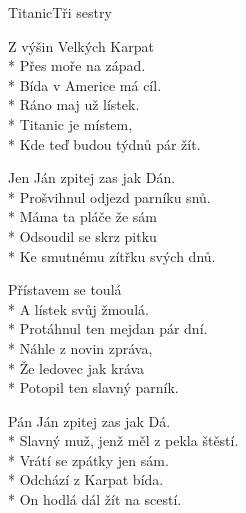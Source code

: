 \documentclass[10.5pt]{book}
\begin{document}
\begin{poem}{Titanic}{Tři sestry}

\settowidth{\versewidth}{Slavný muž, jenž měl z pekla štěstí}

Z výšin Velkých Karpat\\*
Přes moře na západ.\\*
Bída v Americe má cíl.\\*
Ráno maj už lístek.\\*
Titanic je místem,\\*
Kde teď budou týdnů pár žít.

Jen Ján zpitej zas jak Dán.\\*
Prošvihnul odjezd parníku snů.\\*
Máma ta pláče že sám\\*
Odsoudil se skrz pitku\\*
Ke smutnému zítřku svých dnů.

Přístavem se toulá\\*
A lístek svůj žmoulá.\\*
Protáhnul ten mejdan pár dní.\\*
Náhle z novin zpráva,\\*
Že ledovec jak kráva\\*
Potopil ten slavný parník.

Pán Ján zpitej zas jak Dá.\\*
Slavný muž, jenž měl z pekla štěstí.\\*
Vrátí se zpátky jen sám.\\*
Odchází z Karpat bída.\\*
On hodlá dál žít na scestí.

\end{poem}
\end{document}
